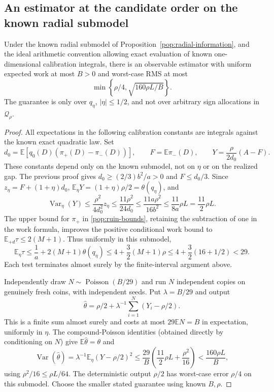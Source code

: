 \subsection{An estimator at the candidate order on the known radial submodel}
\begin{corollary}\label{pop:radial-upper}
Under the known radial submodel of Proposition~\ref{pop:radial-information},
and the ideal arithmetic convention allowing exact evaluation of known
one-dimensional calibration integrals, there is an observable estimator
with uniform expected work at most $B>0$ and worst-case RMS at most
\[
 \min\left\{\rho/4,\sqrt{160\rho L/B}\right\}.
\]
The guarantee is only over $q_\eta$, $|\eta|\le1/2$, and not over
arbitrary sign allocations in $\mathcal Q_\rho$.
\end{corollary}
\begin{proof}
All expectations in the following calibration constants are integrals
against the known exact quadratic law. Set
\[
 d_0=\mathbb E[q_0(D)(\pi_+(D)-\pi_-(D))],\qquad
 F=\mathbb E\pi_-(D),\qquad
 Y=\frac{\rho}{2d_0}(A-F).
\]
These constants depend only on the known submodel, not on $\eta$ or on
the realized gap. The previous proof gives $d_0\ge(2/3)b^2/a>0$ and
$F\le d_0/3$. Since $z_\eta=F+(1+\eta)d_0$,
$\mathbb E_\eta Y=(1+\eta)\rho/2=\theta(q_\eta)$, and
\[
 \operatorname{Var}_\eta(Y)
 \le\frac{\rho^2}{4d_0^2}z_\eta
 \le\frac{11\rho^2}{24d_0}
 \le\frac{11a\rho^2}{16b^2}
 \le\frac{11}{8a}\rho L=\frac{11}{2}\rho L.
\]
The upper bound for $\pi_+$ in \eqref{pop:ruin-bounds}, retaining the
subtraction of one in the work formula, improves the positive conditional
work bound to $\mathbb E_{+d}\tau\le2(M+1)$. Thus uniformly in this
submodel,
\[
 \mathbb E_\eta\tau
 \le\frac1a+2(M+1)\theta(q_\eta)
 \le4+\frac32(M+1)\rho
 \le4+\frac32(16+1/2)<29.
\]
Each test terminates almost surely by the finite-interval argument above.

Independently draw $N\sim\operatorname{Poisson}(B/29)$ and run $N$
independent copies on genuinely fresh coins, with independent seeds. Put
$\lambda=B/29$ and output
\[
 \widehat\theta=\rho/2+\lambda^{-1}
                   \sum_{i=1}^N(Y_i-\rho/2).
\]
This is a finite sum almost surely and costs at most $29\mathbb EN=B$
in expectation, uniformly in $\eta$. The compound-Poisson identities
(obtained directly by conditioning on $N$) give
$\mathbb E\widehat\theta=\theta$ and
\[
 \operatorname{Var}(\widehat\theta)
 =\lambda^{-1}\mathbb E_\eta(Y-\rho/2)^2
 \le\frac{29}{B}\left(\frac{11}{2}\rho L+\frac{\rho^2}{16}\right)
 <\frac{160\rho L}{B},
\]
using $\rho^2/16\le\rho L/64$.
The deterministic output $\rho/2$ has worst-case error $\rho/4$ on this
submodel. Choose the smaller stated guarantee using known $B,\rho$.
\end{proof}

